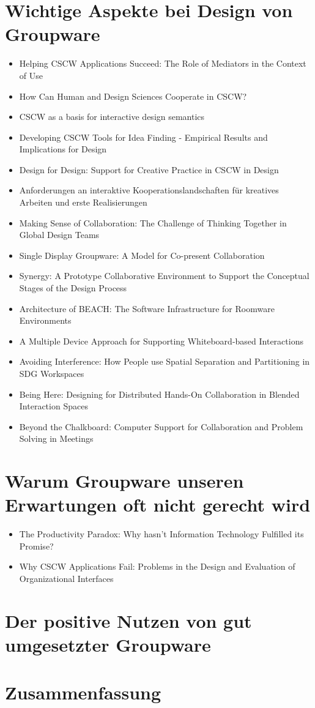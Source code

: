 \section{Wichtige Aspekte bei Design von Groupware}
\begin{itemize}
	\item {Helping CSCW Applications Succeed: The Role of Mediators in the Context of Use}
	\item {How Can Human and Design Sciences Cooperate in CSCW?}
	\item {CSCW as a basis for interactive design semantics}
	\item {Developing CSCW Tools for Idea Finding - Empirical Results and Implications for Design}
	\item {Design for Design: Support for Creative Practice in CSCW in Design}
	\item {Anforderungen an interaktive Kooperationslandschaften für kreatives Arbeiten und erste Realisierungen}
	\item {Making Sense of Collaboration: The Challenge of Thinking Together in Global Design Teams}
	\item {Single Display Groupware: A Model for Co-present Collaboration}
	\item {Synergy: A Prototype Collaborative Environment to Support the Conceptual Stages of the Design Process}
	\item {Architecture of BEACH: The Software Infrastructure for Roomware Environments}
	\item {A Multiple Device Approach for Supporting Whiteboard-based Interactions}
	\item {Avoiding Interference: How People use Spatial Separation and Partitioning in SDG Workspaces}
	\item {Being Here: Designing for Distributed Hands-On Collaboration in Blended Interaction Spaces}
	\item {Beyond the Chalkboard: Computer Support for Collaboration and Problem Solving in Meetings}
\end{itemize}

\section{Warum Groupware unseren Erwartungen oft nicht gerecht wird}
\begin{itemize}
	\item {The Productivity Paradox: Why hasn't Information Technology Fulfilled its Promise?}
	\item {Why CSCW Applications Fail: Problems in the Design and Evaluation of Organizational Interfaces}
\end{itemize}

\section{Der positive Nutzen von gut umgesetzter Groupware}

\section*{Zusammenfassung}